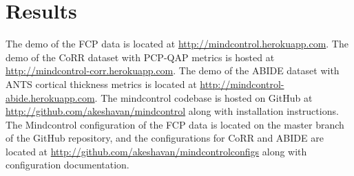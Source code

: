 \section{Results}

The demo of the FCP data is located at \href{http://mindcontrol.herokuapp.com}{http://mindcontrol.herokuapp.com}. The demo of the CoRR dataset with PCP-QAP metrics is hosted at \href{http://mindcontrol-corr.herokuapp.com}{http://mindcontrol-corr.herokuapp.com}. The demo of the ABIDE dataset with ANTS cortical thickness metrics is located at \href{http://mindcontrol-abide.herokuapp.com}{http://mindcontrol-abide.herokuapp.com}. The mindcontrol codebase is hosted on GitHub at \href{http://github.com/akeshavan/mindcontrol}{http://github.com/akeshavan/mindcontrol} along with installation instructions. The Mindcontrol configuration of the FCP data is located on the master branch of the GitHub repository, and the configurations for CoRR and ABIDE are located at \href{http://github.com/akeshavan/mindcontrol_configs}{http://github.com/akeshavan/mindcontrol\textunderscore configs} along with configuration documentation. 

